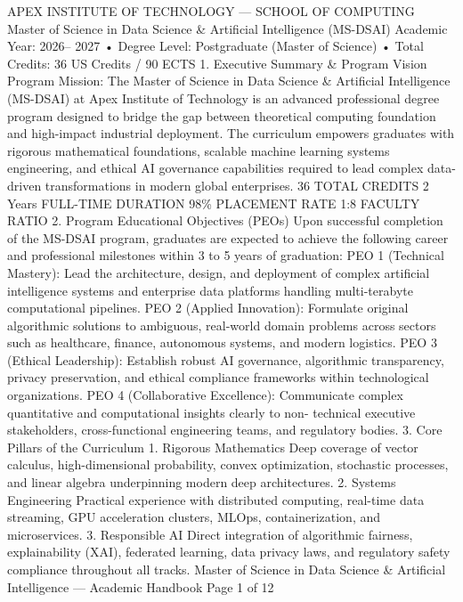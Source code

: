 APEX INSTITUTE OF TECHNOLOGY — SCHOOL OF COMPUTING
Master of Science in Data Science \& Artificial
Intelligence (MS-DSAI)
Academic Year: 2026–
2027
•
Degree Level: Postgraduate (Master of
Science)
•
Total Credits: 36 US Credits / 90
ECTS
1. Executive Summary \& Program Vision
Program Mission: The Master of Science in Data Science \& Artificial Intelligence (MS-DSAI) at Apex Institute of
Technology is an advanced professional degree program designed to bridge the gap between theoretical
computing foundation and high-impact industrial deployment. The curriculum empowers graduates with
rigorous mathematical foundations, scalable machine learning systems engineering, and ethical AI governance
capabilities required to lead complex data-driven transformations in modern global enterprises.
36
TOTAL CREDITS
2 Years
FULL-TIME DURATION
98\%
PLACEMENT RATE
1:8
FACULTY RATIO
2. Program Educational Objectives (PEOs)
Upon successful completion of the MS-DSAI program, graduates are expected to achieve the following career and
professional milestones within 3 to 5 years of graduation:
PEO 1 (Technical Mastery): Lead the architecture, design, and deployment of complex artificial intelligence systems and
enterprise data platforms handling multi-terabyte computational pipelines.
PEO 2 (Applied Innovation): Formulate original algorithmic solutions to ambiguous, real-world domain problems across
sectors such as healthcare, finance, autonomous systems, and modern logistics.
PEO 3 (Ethical Leadership): Establish robust AI governance, algorithmic transparency, privacy preservation, and ethical
compliance frameworks within technological organizations.
PEO 4 (Collaborative Excellence): Communicate complex quantitative and computational insights clearly to non-
technical executive stakeholders, cross-functional engineering teams, and regulatory bodies.
3. Core Pillars of the Curriculum
1. Rigorous Mathematics
Deep coverage of vector calculus,
high-dimensional probability, convex
optimization, stochastic processes,
and linear algebra underpinning
modern deep architectures.
2. Systems Engineering
Practical experience with distributed
computing, real-time data streaming,
GPU acceleration clusters, MLOps,
containerization, and microservices.
3. Responsible AI
Direct integration of algorithmic
fairness, explainability (XAI),
federated learning, data privacy laws,
and regulatory safety compliance
throughout all tracks.
Master of Science in Data Science \& Artificial Intelligence — Academic Handbook
Page 1 of 12


